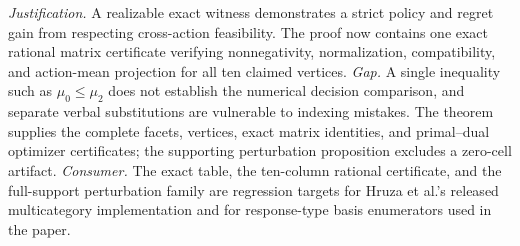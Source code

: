\documentclass{article}
\begin{document}
\par\smallskip\noindent \textit{Justification.} A realizable exact witness demonstrates a strict policy and regret gain from respecting cross-action feasibility.  The proof now contains one exact rational matrix certificate verifying nonnegativity, normalization, compatibility, and action-mean projection for all ten claimed vertices. \textit{Gap.} A single inequality such as \(\mu_0\leq\mu_2\) does not establish the numerical decision comparison, and separate verbal substitutions are vulnerable to indexing mistakes.  The theorem supplies the complete facets, vertices, exact matrix identities, and primal--dual optimizer certificates; the supporting perturbation proposition excludes a zero-cell artifact. \textit{Consumer.} The exact table, the ten-column rational certificate, and the full-support perturbation family are regression targets for Hruza et al.'s released multicategory implementation and for response-type basis enumerators used in the paper.
\end{document}
